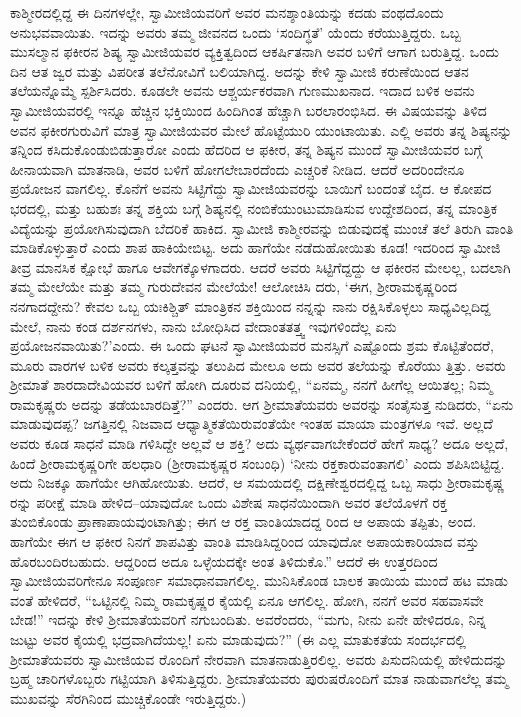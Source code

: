 ಕಾಶ್ಮೀರದಲ್ಲಿದ್ದ ಈ ದಿನಗಳಲ್ಲೇ, ಸ್ವಾಮೀಜಿಯವರಿಗೆ ಅವರ ಮನಶ್ಶಾಂತಿಯನ್ನು ಕದಡು ವಂಥದೊಂದು ಅನುಭವವಾಯಿತು. ಇದನ್ನು ಅವರು ತಮ್ಮ ಜೀವನದ ಒಂದು ‘ಸಂದಿಗ್ಧತೆ’ ಯೆಂದು ಕರೆಯುತ್ತಿದ್ದರು. ಒಬ್ಬ ಮುಸಲ್ಮಾನ ಫಕೀರನ ಶಿಷ್ಯ ಸ್ವಾಮೀಜಿಯವರ ವ್ಯಕ್ತಿತ್ವದಿಂದ ಆಕರ್ಷಿತನಾಗಿ ಅವರ ಬಳಿಗೆ ಆಗಾಗ ಬರುತ್ತಿದ್ದ. ಒಂದು ದಿನ ಆತ ಜ್ವರ ಮತ್ತು ವಿಪರೀತ ತಲೆನೋವಿಗೆ ಬಲಿಯಾಗಿದ್ದ. ಅದನ್ನು ಕೇಳಿ ಸ್ವಾಮೀಜಿ ಕರುಣೆಯಿಂದ ಆತನ ತಲೆಯನ್ನೊಮ್ಮೆ ಸ್ಪರ್ಶಿಸಿದರು. ಕೂಡಲೇ ಅವನು ಆಶ್ಚರ್ಯಕರವಾಗಿ ಗುಣಮುಖನಾದ. ಇದಾದ ಬಳಿಕ ಅವನು ಸ್ವಾಮೀಜಿಯವರಲ್ಲಿ ಇನ್ನೂ ಹೆಚ್ಚಿನ ಭಕ್ತಿಯಿಂದ ಹಿಂದಿಗಿಂತ ಹೆಚ್ಚಾಗಿ ಬರಲಾರಂಭಿಸಿದ. ಈ ವಿಷಯವನ್ನು ತಿಳಿದ ಅವನ ಫಕೀರಗುರುವಿಗೆ ಮಾತ್ರ ಸ್ವಾಮೀಜಿಯವರ ಮೇಲೆ ಹೊಟ್ಟೆಯುರಿ ಯುಂಟಾಯಿತು. ಎಲ್ಲಿ ಅವರು ತನ್ನ ಶಿಷ್ಯನನ್ನು ತನ್ನಿಂದ ಕಸಿದುಕೊಂಡುಬಿಡುತ್ತಾರೋ ಎಂದು ಹೆದರಿದ ಆ ಫಕೀರ, ತನ್ನ ಶಿಷ್ಯನ ಮುಂದೆ ಸ್ವಾಮೀಜಿಯವರ ಬಗ್ಗೆ ಹೀನಾಯವಾಗಿ ಮಾತನಾಡಿ, ಅವರ ಬಳಿಗೆ ಹೋಗಲೇಬಾರದೆಂದು ಎಚ್ಚರಿಕೆ ನೀಡಿದ. ಆದರೆ ಅದರಿಂದೇನೂ ಪ್ರಯೋಜನ ವಾಗಲಿಲ್ಲ. ಕೊನೆಗೆ ಅವನು ಸಿಟ್ಟಿಗೆದ್ದು ಸ್ವಾಮೀಜಿಯವರನ್ನು ಬಾಯಿಗೆ ಬಂದಂತೆ ಬೈದ. ಆ ಕೋಪದ ಭರದಲ್ಲಿ, ಮತ್ತು ಬಹುಶಃ ತನ್ನ ಶಕ್ತಿಯ ಬಗ್ಗೆ ಶಿಷ್ಯನಲ್ಲಿ ನಂಬಿಕೆಯುಂಟುಮಾಡಿಸುವ ಉದ್ದೇಶದಿಂದ, ತನ್ನ ಮಾಂತ್ರಿಕ ವಿದ್ಯೆಯನ್ನು ಪ್ರಯೋಗಿಸುವುದಾಗಿ ಬೆದರಿಕೆ ಹಾಕಿದ. ಸ್ವಾಮೀಜಿ ಕಾಶ್ಮೀರವನ್ನು ಬಿಡುವುದಕ್ಕೆ ಮುಂಚೆ ತಲೆ ತಿರುಗಿ ವಾಂತಿ ಮಾಡಿಕೊಳ್ಳುತ್ತಾರೆ ಎಂದು ಶಾಪ ಹಾಕಿಯೇಬಿಟ್ಟ. ಅದು ಹಾಗೆಯೇ ನಡೆದುಹೋಯಿತು ಕೂಡ! ಇದರಿಂದ ಸ್ವಾಮೀಜಿ ತೀವ್ರ ಮಾನಸಿಕ ಕ್ಷೋಭೆ ಹಾಗೂ ಆವೇಗಕ್ಕೊಳಗಾದರು. ಆದರೆ ಅವರು ಸಿಟ್ಟಿಗೆದ್ದದ್ದು ಆ ಫಕೀರನ ಮೇಲಲ್ಲ, ಬದಲಾಗಿ ತಮ್ಮ ಮೇಲೆಯೇ ಮತ್ತು ತಮ್ಮ ಗುರುದೇವನ ಮೇಲೆಯೇ! ಆಲೋಚಿಸಿ ದರು, ‘ಈಗ, ಶ್ರೀರಾಮಕೃಷ್ಣರಿಂದ ನನಗಾದದ್ದೇನು? ಕೇವಲ ಒಬ್ಬ ಯಃಕಿಶ್ಚಿತ್ ಮಾಂತ್ರಿಕನ ಶಕ್ತಿಯಿಂದ ನನ್ನನ್ನು ನಾನು ರಕ್ಷಿಸಿಕೊಳ್ಳಲು ಸಾಧ್ಯವಿಲ್ಲದಿದ್ದ ಮೇಲೆ, ನಾನು ಕಂಡ ದರ್ಶನಗಳು, ನಾನು ಬೋಧಿಸಿದ ವೇದಾಂತತತ್ತ್ವ ಇವುಗಳಿಂದೆಲ್ಲ ಏನು ಪ್ರಯೋಜನವಾಯಿತು?’ಎಂದು. ಈ ಒಂದು ಘಟನೆ ಸ್ವಾಮೀಜಿಯವರ ಮನಸ್ಸಿಗೆ ಎಷ್ಟೊಂದು ಶ್ರಮ ಕೊಟ್ಟಿತೆಂದರೆ, ಮೂರು ವಾರಗಳ ಬಳಿಕ ಅವರು ಕಲ್ಕತ್ತವನ್ನು ತಲುಪಿದ ಮೇಲೂ ಅದು ಅವರ ತಲೆಯನ್ನು ಕೊರೆಯು ತ್ತಿತ್ತು. ಅವರು ಶ್ರೀಮಾತೆ ಶಾರದಾದೇವಿಯವರ ಬಳಿಗೆ ಹೋಗಿ ದೂರುವ ದನಿಯಲ್ಲಿ, “ಏನಮ್ಮ, ನನಗೆ ಹೀಗೆಲ್ಲ ಆಯಿತಲ್ಲ; ನಿಮ್ಮ ರಾಮಕೃಷ್ಣರು ಅದನ್ನು ತಡೆಯಬಾರದಿತ್ತೆ?” ಎಂದರು. ಆಗ ಶ್ರೀಮಾತೆಯವರು ಅವರನ್ನು ಸಂತೈಸುತ್ತ ನುಡಿದರು, “ಏನು ಮಾಡುವುದಪ್ಪ? ಜಗತ್ತಿನಲ್ಲಿ ನಿಜವಾದ ಆಧ್ಯಾತ್ಮಿಕತೆಯಿರುವಂತೆಯೇ ಇಂತಹ ಮಾಯಾ ಮಂತ್ರಗಳೂ ಇವೆ. ಅಲ್ಲದೆ ಅವರು ಕೂಡ ಸಾಧನೆ ಮಾಡಿ ಗಳಿಸಿದ್ದೇ ಅಲ್ಲವೆ ಆ ಶಕ್ತಿ? ಅದು ವ್ಯರ್ಥವಾಗಬೇಕೆಂದರೆ ಹೇಗೆ ಸಾಧ್ಯ? ಅದೂ ಅಲ್ಲದೆ, ಹಿಂದೆ ಶ್ರೀರಾಮಕೃಷ್ಣರಿಗೇ ಹಲಧಾರಿ (ಶ್ರೀರಾಮಕೃಷ್ಣರ ಸಂಬಂಧಿ) ‘ನೀನು ರಕ್ತಕಾರುವಂತಾಗಲಿ’ ಎಂದು ಶಪಿಸಿಬಿಟ್ಟಿದ್ದ. ಅದು ನಿಜಕ್ಕೂ ಹಾಗೆಯೇ ಆಗಿಹೋಯಿತು. ಆದರೆ, ಆ ಸಮಯದಲ್ಲಿ ದಕ್ಷಿಣೇಶ್ವರದಲ್ಲಿದ್ದ ಒಬ್ಬ ಸಾಧು ಶ್ರೀರಾಮಕೃಷ್ಣ ರನ್ನು ಪರೀಕ್ಷೆ ಮಾಡಿ ಹೇಳಿದ–ಯಾವುದೋ ಒಂದು ವಿಶೇಷ ಸಾಧನೆಯಿಂದಾಗಿ ಅವರ ತಲೆಯೊಳಗೆ ರಕ್ತ ತುಂಬಿಕೊಂಡು ಪ್ರಾಣಾಪಾಯವುಂಟಾಗಿತ್ತು; ಈಗ ಆ ರಕ್ತ ವಾಂತಿಯಾದದ್ದ ರಿಂದ ಆ ಅಪಾಯ ತಪ್ಪಿತು, ಅಂದ. ಹಾಗೆಯೇ ಈಗ ಆ ಫಕೀರ ನಿನಗೆ ಶಾಪವಿತ್ತು ವಾಂತಿ ಮಾಡಿಸಿದ್ದರಿಂದ ಯಾವುದೋ ಅಪಾಯಕಾರಿಯಾದ ವಸ್ತು ಹೊರಬಂದಿರಬಹುದು. ಆದ್ದರಿಂದ ಅದೂ ಒಳ್ಳೆಯದಕ್ಕೇ ಅಂತ ತಿಳಿದುಕೊ.” ಆದರೆ ಈ ಉತ್ತರದಿಂದ ಸ್ವಾಮೀಜಿಯವರಿಗೇನೂ ಸಂಪೂರ್ಣ ಸಮಾಧಾನವಾಗಲಿಲ್ಲ. ಮುನಿಸಿಕೊಂಡ ಬಾಲಕ ತಾಯಿಯ ಮುಂದೆ ಹಟ ಮಾಡು ವಂತೆ ಹೇಳಿದರೆ, “ಒಟ್ಟಿನಲ್ಲಿ ನಿಮ್ಮ ರಾಮಕೃಷ್ಣರ ಕೈಯಲ್ಲಿ ಏನೂ ಆಗಲಿಲ್ಲ. ಹೋಗಿ, ನನಗೆ ಅವರ ಸಹವಾಸವೇ ಬೇಡ!” ಇದನ್ನು ಕೇಳಿ ಶ್ರೀಮಾತೆಯವರಿಗೆ ನಗುಬಂದಿತು. ಅವರೆಂದರು, “ಮಗು, ನೀನು ಏನೇ ಹೇಳಿದರೂ, ನಿನ್ನ ಜುಟ್ಟು ಅವರ ಕೈಯಲ್ಲಿ ಭದ್ರವಾಗಿದೆಯಲ್ಲ! ಏನು ಮಾಡುವುದು?” (ಈ ಎಲ್ಲ ಮಾತುಕತೆಯ ಸಂದರ್ಭದಲ್ಲಿ ಶ್ರೀಮಾತೆಯವರು ಸ್ವಾಮೀಜಿಯವ ರೊಂದಿಗೆ ನೇರವಾಗಿ ಮಾತನಾಡುತ್ತಿರಲಿಲ್ಲ. ಅವರು ಪಿಸುದನಿಯಲ್ಲಿ ಹೇಳಿದುದನ್ನು ಬ್ರಹ್ಮ ಚಾರಿಗಳೊಬ್ಬರು ಗಟ್ಟಿಯಾಗಿ ತಿಳಿಸುತ್ತಿದ್ದರು. ಶ್ರೀಮಾತೆಯವರು ಪುರುಷರೊಂದಿಗೆ ಮಾತ ನಾಡುವಾಗಲೆಲ್ಲ ತಮ್ಮ ಮುಖವನ್ನು ಸೆರಗಿನಿಂದ ಮುಚ್ಚಿಕೊಂಡೇ ಇರುತ್ತಿದ್ದರು.)

